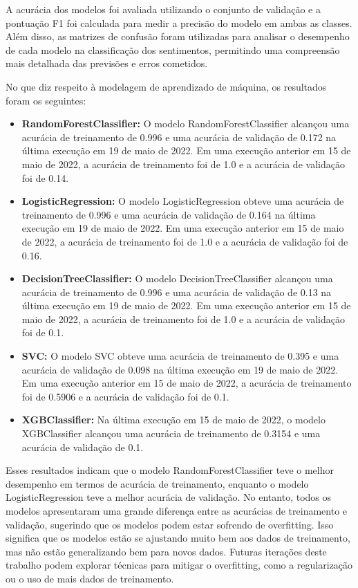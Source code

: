 A acurácia dos modelos foi avaliada utilizando o conjunto de validação e a pontuação F1 foi calculada para medir a precisão do modelo em ambas as classes. Além disso, as matrizes de confusão foram utilizadas para analisar o desempenho de cada modelo na classificação dos sentimentos, permitindo uma compreensão mais detalhada das previsões e erros cometidos.

No que diz respeito à modelagem de aprendizado de máquina, os resultados foram os seguintes:

\begin{itemize}
	\item \textbf{RandomForestClassifier:} O modelo RandomForestClassifier alcançou uma acurácia de treinamento de 0.996 e uma acurácia de validação de 0.172 na última execução em 19 de maio de 2022. Em uma execução anterior em 15 de maio de 2022, a acurácia de treinamento foi de 1.0 e a acurácia de validação foi de 0.14.
	\item \textbf{LogisticRegression:} O modelo LogisticRegression obteve uma acurácia de treinamento de 0.996 e uma acurácia de validação de 0.164 na última execução em 19 de maio de 2022. Em uma execução anterior em 15 de maio de 2022, a acurácia de treinamento foi de 1.0 e a acurácia de validação foi de 0.16.
	\item \textbf{DecisionTreeClassifier:} O modelo DecisionTreeClassifier alcançou uma acurácia de treinamento de 0.996 e uma acurácia de validação de 0.13 na última execução em 19 de maio de 2022. Em uma execução anterior em 15 de maio de 2022, a acurácia de treinamento foi de 1.0 e a acurácia de validação foi de 0.1.
	\item \textbf{SVC:} O modelo SVC obteve uma acurácia de treinamento de 0.395 e uma acurácia de validação de 0.098 na última execução em 19 de maio de 2022. Em uma execução anterior em 15 de maio de 2022, a acurácia de treinamento foi de 0.5906 e a acurácia de validação foi de 0.1.
	\item \textbf{XGBClassifier:} Na última execução em 15 de maio de 2022, o modelo XGBClassifier alcançou uma acurácia de treinamento de 0.3154 e uma acurácia de validação de 0.1.
\end{itemize}

Esses resultados indicam que o modelo RandomForestClassifier teve o melhor desempenho em termos de acurácia de treinamento, enquanto o modelo LogisticRegression teve a melhor acurácia de validação. No entanto, todos os modelos apresentaram uma grande diferença entre as acurácias de treinamento e validação, sugerindo que os modelos podem estar sofrendo de overfitting. Isso significa que os modelos estão se ajustando muito bem aos dados de treinamento, mas não estão generalizando bem para novos dados. Futuras iterações deste trabalho podem explorar técnicas para mitigar o overfitting, como a regularização ou o uso de mais dados de treinamento.

